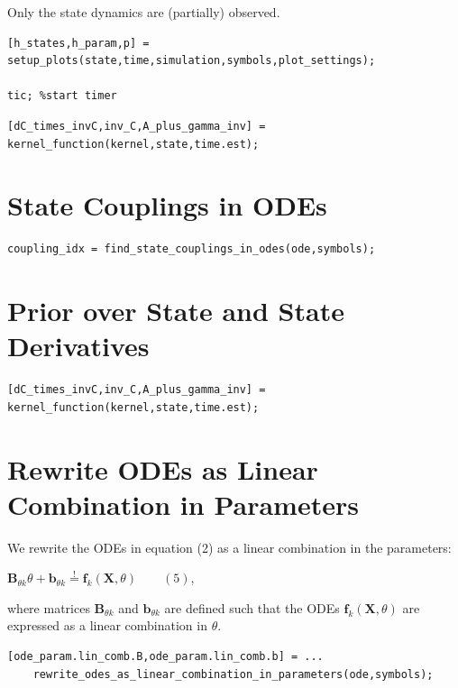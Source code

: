 \begin{par}
Only the state dynamics are (partially) observed.
\end{par} \vspace{1em}
\color{RoyalPurple}\begin{verbatim}
[h_states,h_param,p] = setup_plots(state,time,simulation,symbols,plot_settings);

tic; %start timer
\end{verbatim}
\color{black}

\color{RoyalPurple}\begin{verbatim}
[dC_times_invC,inv_C,A_plus_gamma_inv] = kernel_function(kernel,state,time.est);
\end{verbatim}
\color{black}


\section{State Couplings in ODEs}

\color{RoyalPurple}\begin{verbatim}
coupling_idx = find_state_couplings_in_odes(ode,symbols);
\end{verbatim}
\color{black}

\section{Prior over State and State Derivatives}
\color{RoyalPurple}\begin{verbatim}
[dC_times_invC,inv_C,A_plus_gamma_inv] = kernel_function(kernel,state,time.est);
\end{verbatim}
\color{black}

\section{Rewrite ODEs as Linear Combination in Parameters}

\begin{par}
We rewrite the ODEs in equation (2) as a linear combination in the parameters:
\end{par} \vspace{1em}
\begin{par}
$\mathbf{B}_{\theta k} \theta + \mathbf{b}_{\theta k} \stackrel{!}{=} \mathbf{f}_k(\mathbf{X},\theta) \qquad (5)$,
\end{par} \vspace{1em}
\begin{par}
where matrices $\mathbf{B}_{\theta k}$ and $\mathbf{b}_{\theta k}$ are defined such that the ODEs $\mathbf{f}_k(\mathbf{X},\theta)$ are expressed as a linear combination in $\theta$.
\end{par} \vspace{1em}
\color{RoyalPurple}\begin{verbatim}
[ode_param.lin_comb.B,ode_param.lin_comb.b] = ...
    rewrite_odes_as_linear_combination_in_parameters(ode,symbols);
\end{verbatim}
\color{black}


